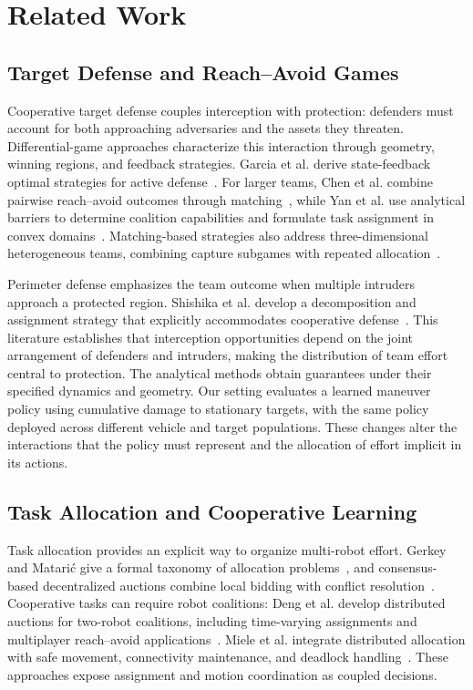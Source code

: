 \section{Related Work}
\subsection{Target Defense and Reach--Avoid Games}
Cooperative target defense couples interception with protection: defenders must account for both approaching adversaries and the assets they threaten. Differential-game approaches characterize this interaction through geometry, winning regions, and feedback strategies. Garcia et al. derive state-feedback optimal strategies for active defense~\cite{garcia2019activedefense}. For larger teams, Chen et al. combine pairwise reach--avoid outcomes through matching~\cite{chen2017reachavoid}, while Yan et al. use analytical barriers to determine coalition capabilities and formulate task assignment in convex domains~\cite{yan2020barriers}. Matching-based strategies also address three-dimensional heterogeneous teams, combining capture subgames with repeated allocation~\cite{yan2022matching}.

Perimeter defense emphasizes the team outcome when multiple intruders approach a protected region. Shishika et al. develop a decomposition and assignment strategy that explicitly accommodates cooperative defense~\cite{shishika2020perimeter}. This literature establishes that interception opportunities depend on the joint arrangement of defenders and intruders, making the distribution of team effort central to protection. The analytical methods obtain guarantees under their specified dynamics and geometry. Our setting evaluates a learned maneuver policy using cumulative damage to stationary targets, with the same policy deployed across different vehicle and target populations. These changes alter the interactions that the policy must represent and the allocation of effort implicit in its actions.

\subsection{Task Allocation and Cooperative Learning}
Task allocation provides an explicit way to organize multi-robot effort. Gerkey and Matari\'{c} give a formal taxonomy of allocation problems~\cite{gerkey2004allocation}, and consensus-based decentralized auctions combine local bidding with conflict resolution~\cite{choi2009auction}. Cooperative tasks can require robot coalitions: Deng et al. develop distributed auctions for two-robot coalitions, including time-varying assignments and multiplayer reach--avoid applications~\cite{deng2024coalitions}. Miele et al. integrate distributed allocation with safe movement, connectivity maintenance, and deadlock handling~\cite{miele2025coordination}. These approaches expose assignment and motion coordination as coupled decisions.


